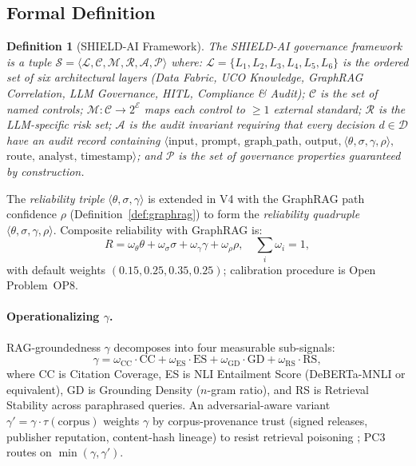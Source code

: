 \documentclass[journal]{IEEEtran}
\newtheorem{definition}{Definition}
\begin{document}
\subsection{Formal Definition}

\begin{definition}[SHIELD-AI Framework]
\label{def:framework}
The SHIELD-AI governance framework is a tuple
$\mathcal{S} = \langle \mathcal{L}, \mathcal{C}, \mathcal{M}, \mathcal{R}, \mathcal{A}, \mathcal{P} \rangle$
where:
$\mathcal{L} = \{L_1, L_2, L_3, L_4, L_5, L_6\}$ is the ordered set of six architectural
layers (Data Fabric, UCO Knowledge, GraphRAG Correlation, LLM Governance, HITL, Compliance \&
Audit);
$\mathcal{C}$ is the set of named controls;
$\mathcal{M}: \mathcal{C} \to 2^{\mathcal{E}}$ maps each control to $\geq 1$ external standard;
$\mathcal{R}$ is the LLM-specific risk set;
$\mathcal{A}$ is the audit invariant requiring that every decision $d \in \mathcal{D}$ have an
audit record containing
$\langle \text{input, prompt, graph\_path, output,}\ \langle\theta, \sigma, \gamma, \rho\rangle,$
$\text{route, analyst, timestamp}\rangle$;
and $\mathcal{P}$ is the set of governance properties guaranteed by construction.
\end{definition}

The \emph{reliability triple} $\langle\theta, \sigma, \gamma\rangle$ is extended in V4 with
the GraphRAG path confidence $\rho$ (Definition~\ref{def:graphrag}) to form the
\emph{reliability quadruple} $\langle\theta, \sigma, \gamma, \rho\rangle$.
Composite reliability with GraphRAG is:
\begin{equation}
R = \omega_\theta\theta + \omega_\sigma\sigma + \omega_\gamma\gamma + \omega_\rho\rho,
\quad \sum_i \omega_i = 1,
\label{eq:R_v4}
\end{equation}
with default weights $(0.15, 0.25, 0.35, 0.25)$; calibration procedure is Open Problem~OP8.

\paragraph{Operationalizing $\gamma$.}
RAG-groundedness $\gamma$ decomposes into four measurable sub-signals:
\begin{equation}
\gamma = \omega_{\text{CC}}\cdot\text{CC} + \omega_{\text{ES}}\cdot\text{ES}
        + \omega_{\text{GD}}\cdot\text{GD} + \omega_{\text{RS}}\cdot\text{RS},
\label{eq:gamma}
\end{equation}
where CC is Citation Coverage, ES is NLI Entailment Score (DeBERTa-MNLI or equivalent),
GD is Grounding Density ($n$-gram ratio), and RS is Retrieval Stability across paraphrased
queries. An adversarial-aware variant $\gamma' = \gamma \cdot \tau(\text{corpus})$ weights
$\gamma$ by corpus-provenance trust (signed releases, publisher reputation, content-hash
lineage) to resist retrieval poisoning \cite{greshake2023indirect}; PC3 routes on
$\min(\gamma, \gamma')$.
\end{document}
